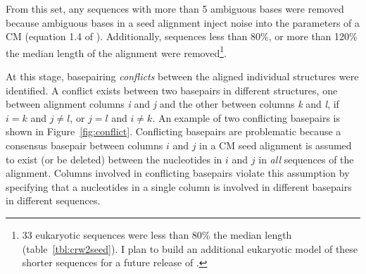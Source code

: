 From this set, any sequences with more than 5 ambiguous bases were
removed because ambiguous bases in a seed alignment inject noise into
the parameters of a CM (equation 1.4 of
\cite{Nawrocki09b}). Additionally, sequences less than 80\%, or more
than 120\% the median length of the alignment were removed\footnote{33
  eukaryotic sequences were less than 80\% the median length
  (table~\ref{tbl:crw2seed}). I plan to build an additional eukaryotic
  model of these shorter sequences for a future release of
  .}.

At this stage, basepairing \emph{conflicts} between the aligned
individual structures were identified. A conflict exists between two
basepairs in different structures, one between alignment columns
\emph{i} and \emph{j} and the other between columns \emph{k} and
\emph{l}, if $i = k$ and $j \neq l$, or $j = l$ and $i \neq k$.  An
example of two conflicting basepairs is shown in
Figure~\ref{fig:conflict}.  Conflicting basepairs are problematic
because a consensus basepair between columns $i$ and $j$ in a CM seed
alignment is assumed to exist (or be deleted) between the nucleotides in
$i$ and $j$ in \emph{all} sequences of the alignment. Columns involved
in conflicting basepairs violate this assumption by specifying that a
nucleotides in a single column is involved in different basepairs in
different sequences.


